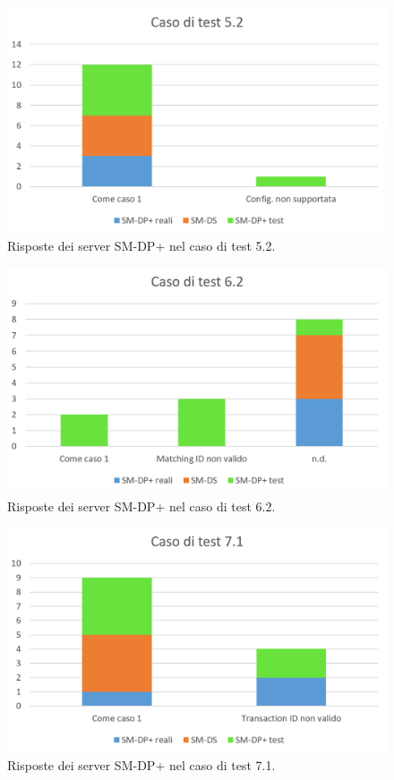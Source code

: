 \documentclass[10pt, oneside]{book}
\begin{document}
\begin{figure}
\includegraphics[width=\linewidth]{test-5-2.png}
\caption{Risposte dei server SM-DP+ nel caso di test 5.2.}
\label{fig:test-5-2}
\end{figure}
\begin{figure}
\includegraphics[width=\linewidth]{test-6-2.png}
\caption{Risposte dei server SM-DP+ nel caso di test 6.2.}
\label{fig:test-6-2}
\end{figure}
\begin{figure}
\includegraphics[width=\linewidth]{test-7-1.png}
\caption{Risposte dei server SM-DP+ nel caso di test 7.1.}
\label{fig:test-7-1}
\end{figure}
\end{document}
